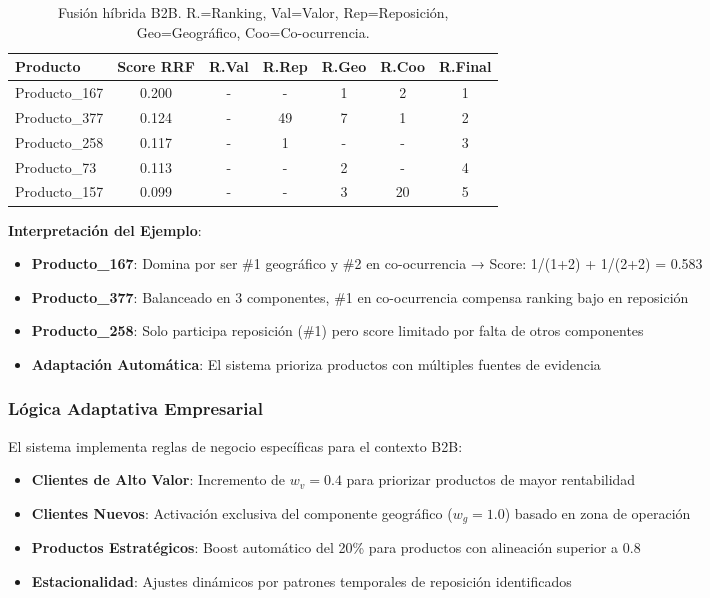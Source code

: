 \documentclass[twocolumn]{article}
\begin{document}
\begin{table}[H]
\centering
\small
\setlength{\tabcolsep}{4pt}
\begin{tabular}{|l|c|c|c|c|c|c|}
\hline
\textbf{Producto} & \textbf{Score RRF} & \textbf{R.Val} & \textbf{R.Rep} & \textbf{R.Geo} & \textbf{R.Coo} & \textbf{R.Final} \\
\hline
Producto\_167 & 0.200 & - & - & 1 & 2 & 1 \\
\hline
Producto\_377 & 0.124 & - & 49 & 7 & 1 & 2 \\
\hline
Producto\_258 & 0.117 & - & 1 & - & - & 3 \\
\hline
Producto\_73 & 0.113 & - & - & 2 & - & 4 \\
\hline
Producto\_157 & 0.099 & - & - & 3 & 20 & 5 \\
\hline
\end{tabular}
\caption{Fusión híbrida B2B. R.=Ranking, Val=Valor, Rep=Reposición, Geo=Geográfico, Coo=Co-ocurrencia.}
\end{table}

\textbf{Interpretación del Ejemplo}:
\begin{itemize}
    \item \textbf{Producto\_167}: Domina por ser \#1 geográfico y \#2 en co-ocurrencia → Score: 1/(1+2) + 1/(2+2) = 0.583
    \item \textbf{Producto\_377}: Balanceado en 3 componentes, \#1 en co-ocurrencia compensa ranking bajo en reposición
    \item \textbf{Producto\_258}: Solo participa reposición (\#1) pero score limitado por falta de otros componentes
    \item \textbf{Adaptación Automática}: El sistema prioriza productos con múltiples fuentes de evidencia
\end{itemize}

\subsubsection{Lógica Adaptativa Empresarial}

El sistema implementa reglas de negocio específicas para el contexto B2B:

\begin{itemize}
    \item \textbf{Clientes de Alto Valor}: Incremento de \(w_v = 0.4\) para priorizar productos de mayor rentabilidad
    \item \textbf{Clientes Nuevos}: Activación exclusiva del componente geográfico (\(w_g = 1.0\)) basado en zona de operación
    \item \textbf{Productos Estratégicos}: Boost automático del 20\% para productos con alineación superior a 0.8
    \item \textbf{Estacionalidad}: Ajustes dinámicos por patrones temporales de reposición identificados
\end{itemize}
\end{document}
